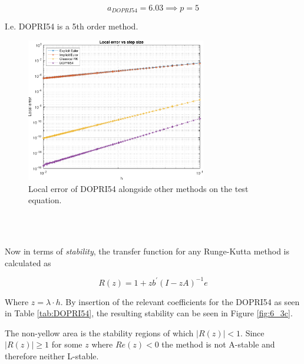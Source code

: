 \begin{equation*}
    a_{DOPRI54} = 6.03 \implies p = 5 
\end{equation*}

I.e. DOPRI54 is a 5th order method.

\begin{figure}[H]
    \centering
    \includegraphics[width=0.7\textwidth]{plots/6_3b.pdf}
    \caption{Local error of DOPRI54 alongside other methods on the test equation.}
    \label{fig:6_3b}
\end{figure}

\\\

Now in terms of \textit{stability}, the transfer function for any Runge-Kutta method is calculated as 

\begin{equation}
R(z)=1+z b^{\prime}(I-z A)^{-1} e
\end{equation}

Where $z = \lambda \cdot h$. By insertion of the relevant coefficients for the DOPRI54 as seen in Table \ref{tab:DOPRI54}, the resulting stability can be seen in Figure \ref{fig:6_3c}.



The non-yellow area is the stability regions of which $|R(z)| < 1$. Since $|R(z)| \geq 1$ for some $z$ where $Re(z) < 0$ the method is not A-stable and therefore neither L-stable.


